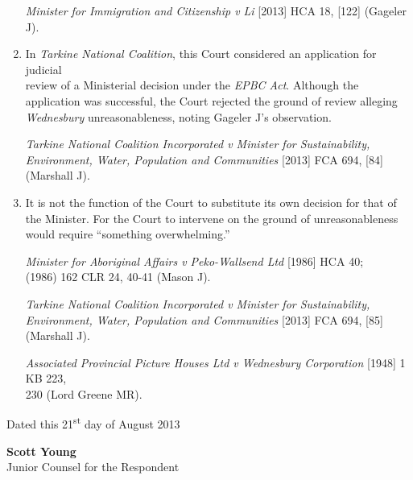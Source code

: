 \documentclass[12pt]{article}
\begin{document}
\begin{enumerate}[1.]
  \emph{Minister for Immigration and Citizenship v Li} {[}2013{]} HCA
  18, {[}122{]} (Gageler J).
\item
  In \emph{Tarkine National Coalition}, this Court considered an
  application for judicial\\ review of a Ministerial decision under the
  \emph{EPBC Act}. Although the application was successful, the Court
  rejected the ground of review alleging \emph{Wednesbury}
  unreasonableness, noting Gageler J's observation.

  \emph{Tarkine National Coalition Incorporated v Minister for
  Sustainability, Environment, Water, Population and Communities}
  {[}2013{]} FCA 694, {[}84{]} (Marshall J).
\item
  It is not the function of the Court to substitute its own decision for
  that of the Minister. For the Court to intervene on the ground of
  unreasonableness would require ``something overwhelming.''

  \emph{Minister for Aboriginal Affairs v Peko-Wallsend Ltd} {[}1986{]}
  HCA 40; \\(1986) 162 CLR 24, 40-41 (Mason J).

  \emph{Tarkine National Coalition Incorporated v Minister for
  Sustainability, Environment, Water, Population and Communities}
  {[}2013{]} FCA 694, {[}85{]} (Marshall J).

  \emph{Associated Provincial Picture Houses Ltd v Wednesbury
  Corporation} {[}1948{]} 1 KB 223, \\ 230 (Lord Greene MR).
\end{enumerate}

\raggedleft
\vfill
Dated this 21\textsuperscript{st} day of August 2013

\vspace{48pt}

\textbf{Scott Young} \\Junior Counsel for the Respondent
\end{document}
